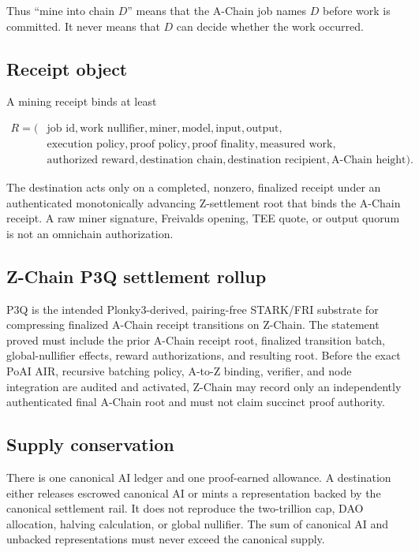 Thus ``mine into chain $D$'' means that the A-Chain job names $D$ before work is
committed. It never means that $D$ can decide whether the work occurred.

\subsection{Receipt object}

A mining receipt binds at least

\begin{equation}
\begin{split}
R=(&\text{job id},\text{work nullifier},\text{miner},\text{model},
\text{input},\text{output},\\
&\text{execution policy},\text{proof policy},\text{proof finality},
\text{measured work},\\
&\text{authorized reward},\text{destination chain},
\text{destination recipient},\text{A-Chain height}).
\end{split}
\end{equation}

The destination acts only on a completed, nonzero, finalized receipt under an
authenticated monotonically advancing Z-settlement root that binds the A-Chain
receipt. A raw miner signature, Freivalds
opening, TEE quote, or output quorum is not an omnichain authorization.

\subsection{Z-Chain P3Q settlement rollup}

P3Q is the intended Plonky3-derived, pairing-free STARK/FRI substrate for
compressing finalized A-Chain receipt transitions on Z-Chain. The statement
proved must include the prior A-Chain receipt root, finalized transition batch,
global-nullifier effects, reward authorizations, and resulting root. Before the
exact PoAI AIR, recursive batching policy, A-to-Z binding, verifier, and node
integration are audited and activated, Z-Chain may record only an independently
authenticated final A-Chain root and must not claim succinct proof authority.

\subsection{Supply conservation}

There is one canonical AI ledger and one proof-earned allowance. A destination
either releases escrowed canonical AI or mints a representation backed by the
canonical settlement rail. It does not reproduce the two-trillion cap, DAO
allocation, halving calculation, or global nullifier. The sum of canonical AI
and unbacked representations must never exceed the canonical supply.

